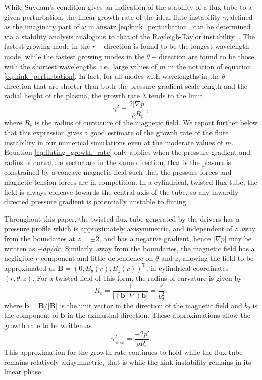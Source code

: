 \documentclass[fleqn,usenatbib]{mnras}
\newcommand{\rev}[1]{{\color{red} {#1}}}
\renewcommand{\vec}[1]{{\bm #1}}
\begin{document}
While Suydam's condition gives an indication of the stability of a flux tube to
a given perturbation, the linear growth rate of the ideal flute instability
$\gamma$, \rev{defined as the imaginary part of $\omega$ in ansatz
  \eqref{eq:kink_perturbation},} can be \rev{determined} via a stability analysis
  analogous to that of the Rayleigh-Taylor
  instability~\citep[][]{goldstonIntroductionPlasmaPhysics2020}.
 \rev{The fastest growing mode in the $r-$direction is found to be the longest
wavelength mode, while the fastest growing modes in the $\theta-$direction
are found to be those with the shortest wavelengths, i.e.~large values of $m$ in
the notation of equation \eqref{eq:kink_perturbation}. In fact, for
all modes with wavelengths in the $\theta-$direction that are shorter
than both the pressure-gradient scale-length and the radial height
of the plasma, the growth rate $\lambda$ tends to the limit}  
\begin{equation}
  \label{eq:fluting_growth_rate}
\gamma^2 = \frac{2|\nabla p|}{\rho R_c},
\end{equation}
where $R_c$ is the radius of curvature of the magnetic field.
\rev{We report further below that this expression gives a good
  estimate of the growth rate of the flute instability in our
  numerical simulations even at the moderate values of $m$.} 
Equation \eqref{eq:fluting_growth_rate}
only applies when the pressure gradient and radius of curvature vector are in
the same direction, that is the plasma is constrained by a concave magnetic
field such that the pressure forces and magnetic tension forces are in
competition. In a cylindrical, twisted flux tube, the field is always concave
towards the central axis of the tube, so any inwardly directed pressure
gradient is potentially unstable to fluting.

Throughout this paper, the twisted flux tube generated by the drivers has
a pressure profile which is approximately axisymmetric, and independent of $z$
away from the boundaries at $z=\pm2$, and has a negative gradient, hence
$|\nabla p|$ may be written as $-d p/ dr$. Similarly, away from the boundaries,
the magnetic field has a negligible $r$ component and little dependence on
$\theta$ and $z$, allowing the field to be approximated as $\vec{B} = (0,
B_{\theta}(r), B_z(r))^{\text{T}}$, in cylindrical coordinates $(r, \theta,
z)$. For a twisted field of this form, the radius of curvature is given by
\begin{equation} \label{eq:radius_of_curvature} R_c
= \frac{1}{|(\vec{b}\cdot\nabla) \vec{b}|} = \frac{r}{b_{\theta}^2},
\end{equation} where $\vec{b} = \vec{B}/|\vec{B}|$ is the unit vector in the
direction of the magnetic field and $b_{\theta}$ is the component of $\vec{b}$
in the azimuthal direction. \rev{These approximations allow} the growth rate to be
written as
\begin{equation}
\label{eq:fluting_growth_rate2}
\gamma_{\text{ideal}}^2 = \frac{-2p'}{\rho R_c}.
\end{equation}
This approximation for the growth rate continues to hold while the flux tube
remains relatively axisymmetric, that is while the kink instability remains in
its linear phase.
\end{document}
